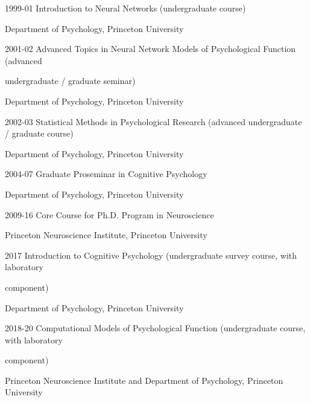\documentclass[10 pt]{article}
\begin{document}
1999-01 \hspace{0.3in} Introduction to Neural Networks (undergraduate course)

\hspace{0.81in} Department of Psychology, Princeton University
    \smallskip

2001-02 \hspace{0.3in} Advanced Topics in Neural Network Models of Psychological Function (advanced

\hspace{0.81in} undergraduate / graduate seminar)

\hspace{0.81in} Department of Psychology, Princeton University
    \smallskip

2002-03 \hspace{0.3in} Statistical Methods in Psychological Research (advanced undergraduate / graduate course)

\hspace{0.81in} Department of Psychology, Princeton University
    \smallskip

2004-07 \hspace{0.3in} Graduate Proseminar in Cognitive Psychology

\hspace{0.81in} Department of Psychology, Princeton University
    \smallskip

2009-16 \hspace{0.3in} Core Course for Ph.D. Program in Neuroscience

\hspace{0.81in} Princeton Neuroscience Institute, Princeton University
    \smallskip

2017 \hspace{0.48in} Introduction to Cognitive Psychology (undergraduate survey course, with laboratory

\hspace{0.81in} component)

\hspace{0.81in} Department of Psychology, Princeton University
    \smallskip

2018-20 \hspace{0.3in} Computational Models of Psychological Function (undergraduate course, with laboratory

\hspace{0.81in} component)

\hspace{0.81in} Princeton Neuroscience Institute and Department of Psychology, Princeton University
    \smallskip
\end{document}
